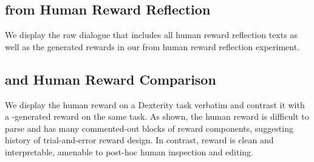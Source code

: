 \subsection{\ourmethod from Human Reward Reflection}
\label{appendix:human-reward-reflection-example}
We display the raw dialogue that includes all human reward reflection texts as well as the generated \ourmethod rewards in our \ourmethod from human reward reflection experiment.
\renewcommand\lstlistingname{Example}
\setcounter{lstlisting}{0}




\subsection{\ourmethod and Human Reward Comparison}
\label{appendix:human-comparison-examples}
We display the human reward on a Dexterity task verbatim and contrast it with a \ourmethod-generated reward on the same task. As shown, the human reward is difficult to parse and has many commented-out blocks of reward components, suggesting history of trial-and-error reward design. In contrast, \ourmethod reward is clean and interpretable, amenable to post-hoc human inspection and editing. 

\renewcommand\lstlistingname{Example}
\setcounter{lstlisting}{0}




\section{}

